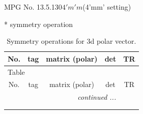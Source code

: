 \documentclass[fleqn,8pt]{jsarticle}
\begin{document}
\setcounter{MaxMatrixCols}{32}

\renewcommand{\tablename}{Table~}
\renewcommand{\figurename}{Figure~}
\begin{center}
\LARGE
MPG No. 13.5.130\quad$4'm'm$\quad(4'mm' setting)
\end{center}
* symmetry operation
\renewcommand{\arraystretch}{1.3}
\begin{longtable}{ccccc}
\caption{Symmetry operations for 3d polar vector.}
 \\
 \hline \hline
No. & tag & matrix (polar) & det & TR \\ \hline \endfirsthead

\multicolumn{4}{l}{\tablename\ \thetable{}} \\
 \hline \hline
No. & tag & matrix (polar) & det & TR \\ \hline \endhead

 \hline \hline
\multicolumn{4}{r}{\footnotesize\it continued ...} \\ \endfoot

 \hline \hline
\multicolumn{4}{r}{} \\ \endlastfoot


\end{longtable}
\end{document}
